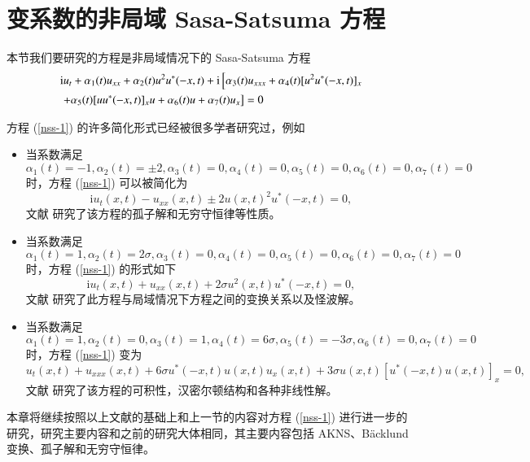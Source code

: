 \chapter{变系数的非局域  Sasa-Satsuma 方程}

本节我们要研究的方程是非局域情况下的 Sasa-Satsuma 方程
\begin{align}
& \mathrm{i}u_{t} + \alpha_1(t) u_{xx} + \alpha_2(t)u^2u^*(-x,t) + \mathrm{i}\left[\alpha_3(t)u_{xxx} + \alpha_{4}(t)[u^{2}u^*(-x,t)]_{x}  \right. \notag\\
& \left. + \alpha_{5}(t)[uu^*(-x,t)]_{x}u + \alpha_{6}(t)u + \alpha_{7}(t)u_x\right] = 0 \label{nss-1}
\end{align}

方程 (\ref{nss-1}) 的许多简化形式已经被很多学者研究过，例如
\begin{itemize}
  \item 当系数满足 $\alpha_1(t)=-1, \alpha_2(t)=\pm 2, \alpha_3(t)=0, \alpha_4(t)=0, \alpha_5(t)=0, \alpha_6(t) = 0, \alpha_7(t) = 0$ 时，方程 (\ref{nss-1}) 可以被简化为
      \begin{equation}
        \mathrm{i}u_t(x,t) - u_{xx}(x,t) \pm 2u(x,t)^2u^*(-x,t) = 0,
      \end{equation}
      文献 \cite{nss-1} 研究了该方程的孤子解和无穷守恒律等性质。
  \item 当系数满足 $\alpha_1(t)=1, \alpha_2(t)=2\sigma, \alpha_3(t)=0, \alpha_4(t)=0, \alpha_5(t)=0, \alpha_6(t) = 0, \alpha_7(t)= 0$ 时，方程 (\ref{nss-1}) 的形式如下
      \begin{equation}
         \mathrm{i}u_t(x,t) + u_{xx}(x,t) + 2\sigma u^2(x,t)u^*(-x,t) = 0,
      \end{equation}
      文献 \cite{nss-2} 研究了此方程与局域情况下方程之间的变换关系以及怪波解。
  \item 当系数满足 $\alpha_1(t)=1, \alpha_2(t)=0, \alpha_3(t)=1, \alpha_4(t)=6\sigma, \alpha_5(t)=-3\sigma, \alpha_6(t) = 0, \alpha_7(t) = 0$ 时，方程 (\ref{nss-1}) 变为
      \begin{equation}
        u_t(x,t) + u_{xxx}(x,t) + 6\sigma u^*(-x,t)u(x,t)u_x(x,t) + 3\sigma u(x,t)[u^*(-x,t)u(x,t)]_x = 0,
      \end{equation}
      文献 \cite{nss-3} 研究了该方程的可积性，汉密尔顿结构和各种非线性解。
\end{itemize}

本章将继续按照以上文献的基础上和上一节的内容对方程 (\ref{nss-1}) 进行进一步的研究，研究主要内容和之前的研究大体相同，其主要内容包括 AKNS、B\"{a}cklund 变换、孤子解和无穷守恒律。

